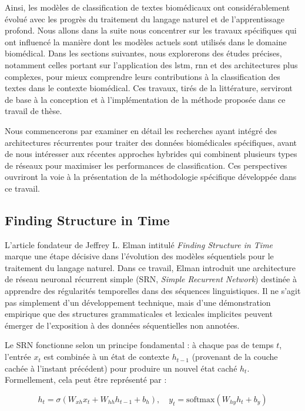 \documentclass[12pt]{report}
\begin{document}
Ainsi, les modèles de classification de textes biomédicaux ont considérablement évolué avec les progrès du traitement du langage naturel et de l'apprentissage profond. Nous allons dans la suite nous concentrer sur les travaux spécifiques qui ont influencé la manière dont les modèles actuels sont utilisés dans le domaine biomédical. Dans les sections suivantes, nous explorerons des études précises, notamment celles portant sur l’application des \gls{lstm}, \gls{rnn} et des architectures plus complexes, pour mieux comprendre leurs contributions à la classification des textes dans le contexte biomédical. Ces travaux, tirés de la littérature, serviront de base à la conception et à l'implémentation de la méthode proposée dans ce travail de thèse.

Nous commencerons par examiner en détail les recherches ayant intégré des architectures récurrentes pour traiter des données biomédicales spécifiques, avant de nous intéresser aux récentes approches hybrides qui combinent plusieurs types de réseaux pour maximiser les performances de classification. Ces perspectives ouvriront la voie à la présentation de la méthodologie spécifique développée dans ce travail.

\subsection{Finding Structure in Time}

L’article fondateur de Jeffrey L. Elman intitulé \textit{Finding Structure in Time}~\cite{elman1990finding} marque une étape décisive dans l’évolution des modèles séquentiels pour le traitement du langage naturel. Dans ce travail, Elman introduit une architecture de réseau neuronal récurrent simple (SRN, \textit{Simple Recurrent Network}) destinée à apprendre des régularités temporelles dans des séquences linguistiques. Il ne s’agit pas simplement d’un développement technique, mais d’une démonstration empirique que des structures grammaticales et lexicales implicites peuvent émerger de l’exposition à des données séquentielles non annotées.

Le SRN fonctionne selon un principe fondamental : à chaque pas de temps $t$, l’entrée $x_t$ est combinée à un état de contexte $h_{t-1}$ (provenant de la couche cachée à l’instant précédent) pour produire un nouvel état caché $h_t$. Formellement, cela peut être représenté par :

\begin{equation}
h_t = \sigma(W_{xh} x_t + W_{hh} h_{t-1} + b_h), \quad y_t = \text{softmax}(W_{hy} h_t + b_y)
\end{equation}
\end{document}
